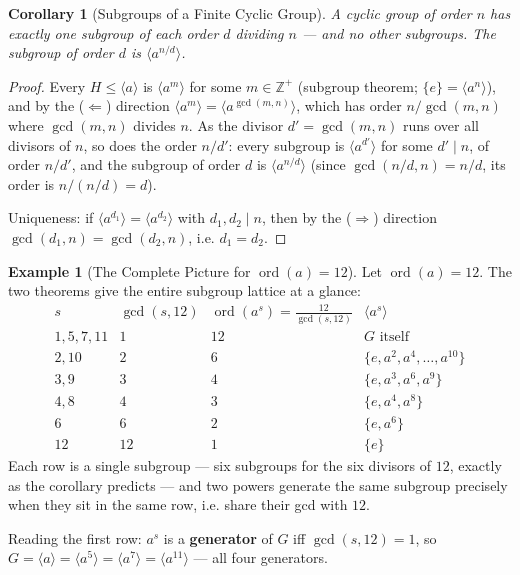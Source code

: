 \documentclass[11pt]{article}
\newcommand{\1}{\mathbf{1}}
\theoremstyle{notestyle}
\newtheorem{corollary}[theorem]{Corollary}
\theoremstyle{definition}
\newtheorem{example}[theorem]{Example}
\begin{document}
\begin{corollary}[Subgroups of a Finite Cyclic Group]
\label{cor:subgroups-of-cyclic}
A cyclic group of order $n$ has exactly one subgroup of each order $d$
dividing $n$ — and no other subgroups. The subgroup of order $d$ is
$\langle a^{n/d} \rangle$.
\end{corollary}
\begin{proof}
Every $H \le \langle a \rangle$ is $\langle a^{m} \rangle$ for some
$m \in \mathbb{Z}^{+}$ (subgroup theorem; $\{e\} = \langle a^{n} \rangle$),
and by the ($\Leftarrow$) direction
$\langle a^{m} \rangle = \langle a^{\gcd(m, n)} \rangle$, which has order
$n/\gcd(m, n)$ where $\gcd(m, n)$ divides $n$. As the divisor
$d' = \gcd(m, n)$ runs over all divisors of $n$, so does the order
$n/d'$: every subgroup is $\langle a^{d'} \rangle$ for some $d' \mid n$, of
order $n / d'$, and the subgroup of order $d$ is $\langle a^{n/d} \rangle$
(since $\gcd(n/d, n) = n/d$, its order is $n/(n/d) = d$).
\par Uniqueness: if $\langle a^{d_1} \rangle = \langle a^{d_2} \rangle$ with
$d_1, d_2 \mid n$, then by the ($\Rightarrow$) direction
$\gcd(d_1, n) = \gcd(d_2, n)$, i.e. $d_1 = d_2$.
\end{proof}
\begin{example}[The Complete Picture for $\operatorname{ord}(a) = 12$]
\label{ex:order-12}
Let $\operatorname{ord}(a) = 12$. The two theorems give the entire subgroup
lattice at a glance:
$$
\begin{array}{c|c|c|c}
s & \gcd(s, 12) & \operatorname{ord}(a^{s}) = \frac{12}{\gcd(s, 12)} &
\langle a^{s} \rangle \\ \hline
1, 5, 7, 11 & 1 & 12 & G \text{ itself} \\
2, 10 & 2 & 6 & \{e, a^{2}, a^{4}, \dots, a^{10}\} \\
3, 9 & 3 & 4 & \{e, a^{3}, a^{6}, a^{9}\} \\
4, 8 & 4 & 3 & \{e, a^{4}, a^{8}\} \\
6 & 6 & 2 & \{e, a^{6}\} \\
12 & 12 & 1 & \{e\}
\end{array}
$$
Each row is a single subgroup — six subgroups for the six divisors of $12$,
exactly as the corollary predicts — and two powers generate the same subgroup
precisely when they sit in the same row, i.e. share their gcd with $12$.
\par Reading the first row: $a^{s}$ is a \textbf{generator} of $G$ iff
$\gcd(s, 12) = 1$, so $G = \langle a \rangle = \langle a^{5} \rangle =
\langle a^{7} \rangle = \langle a^{11} \rangle$ — all four generators.
\end{example}
\end{document}
